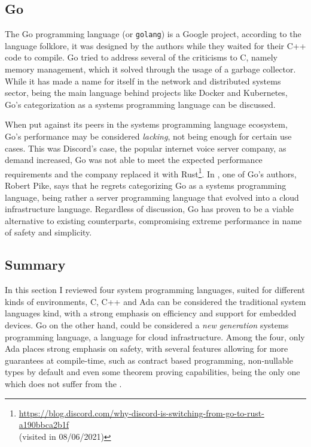 \subsection{Go}

The Go programming language (or \texttt{golang}) is a Google project,
according to the language folklore, it was designed by the authors while they waited for their C++ code to compile.
Go tried to address several of the criticisms to C, namely memory management, which it solved through the usage of a garbage collector.
While it has made a name for itself in the network and distributed systems sector,
being the main language behind projects like Docker and Kubernetes,
Go's categorization as a systems programming language can be discussed.

When put against its peers in the systems programming language ecosystem,
Go's performance may be considered \emph{lacking}, not being enough for certain use cases.
This was Discord's case, the popular internet voice server company, as demand increased,
Go was not able to meet the expected performance requirements and the company replaced it with Rust\footnote{\url{https://blog.discord.com/why-discord-is-switching-from-go-to-rust-a190bbca2b1f}\\(visited in 08/06/2021)}.
In \autocite{Torre2014}, one of Go's authors, Robert Pike, says that he regrets categorizing Go as a systems programming language,
being rather a server programming language that evolved into a cloud infrastructure language.
Regardless of discussion, Go has proven to be a viable alternative to existing counterparts,
compromising extreme performance in name of safety and simplicity.

\subsection{Summary}

In this section I reviewed four system programming languages, suited for different kinds of environments,
C, C++ and Ada can be considered the traditional system languages kind, with a strong emphasis on efficiency
and support for embedded devices.
Go on the other hand, could be considered a \emph{new generation} systems programming language, a language for cloud infrastructure.
Among the four, only Ada places strong emphasis on safety, with several features allowing for more guarantees at compile-time,
such as contract based programming, non-nullable types by default and even some theorem proving capabilities,
being the only one which does not suffer from the .

